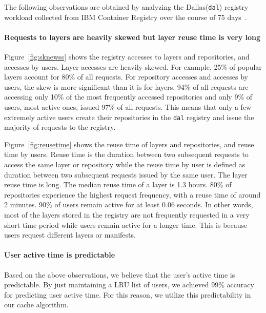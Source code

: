 
The following observations are obtained by analyzing the Dallas(\texttt{dal}) registry workload collected from IBM Container Registry over the course of 75 days~\cite{dockerworkload}. 
\paragraph{Requests to layers are heavily skewed but layer reuse time is very long}

Figure~\ref{fig:sknewss} shows the registry accesses to layers and repositories, and accesses by users. 
Layer accesses are heavily skewed. For example, 25\% of popular layers account for 80\% of all requests. 
For repository accesses and accesses by users, the skew is more significant than it is for layers. %
94\% of all requests are accessing only 10\% of the most frequently accessed repositories and only 9\% of users, most active ones, issued 97\% of all requests. 
This means that only a few extremely active users create their repositories in the \texttt{dal} registry and issue the majority of requests to the registry.

Figure~\ref{fig:reusetime} shows the reuse time of layers and repositories, and reuse time by users.
Reuse time is the duration between two subsequent requests to access the same layer or repository while 
the reuse time by user is defined as duration between two subsequent requests issued by the same user. 
The layer reuse time is long.
The median reuse time of a layer is 1.3 hours. 80\% of repositories experience the highest request frequency, with a reuse time of around 2 minutes. 
90\% of users remain active for at least 0.06 seconds.
In other words, most of the layers stored in the
registry are not frequently requested in a very short
time period while users remain active for a longer time.
This is because users request different layers or manifests.

\paragraph{User active time is predictable} 
Based on the above observations, we believe that the user's active time is predictable. 
By just maintaining a LRU list of users, we achieved 99\% accuracy for predicting user active time.
For this reason, we utilize this predictability in our cache algorithm.

